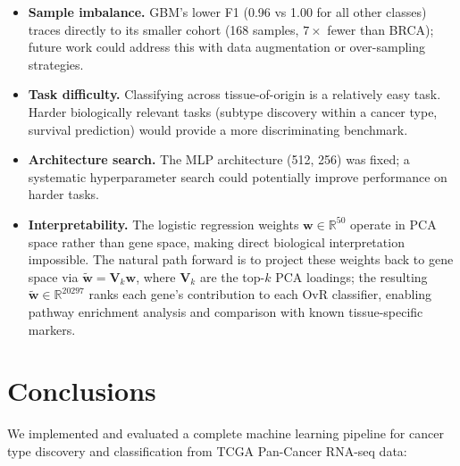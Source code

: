\documentclass[11pt,letterpaper]{article}
\begin{document}
\begin{itemize}[leftmargin=2em,itemsep=1pt]
  \item \textbf{Sample imbalance.}  GBM's lower F1 (0.96 vs 1.00 for all
        other classes) traces directly to its smaller cohort (168 samples,
        $7\times$ fewer than BRCA); future work could address this with
        data augmentation or over-sampling strategies.
  \item \textbf{Task difficulty.}  Classifying across tissue-of-origin is a
        relatively easy task.  Harder biologically relevant tasks (subtype
        discovery within a cancer type, survival prediction) would provide a
        more discriminating benchmark.
  \item \textbf{Architecture search.}  The MLP architecture (512, 256) was
        fixed; a systematic hyperparameter search could potentially improve
        performance on harder tasks.
  \item \textbf{Interpretability.}  The logistic regression weights
        $\mathbf{w} \in \mathbb{R}^{50}$ operate in PCA space rather than gene
        space, making direct biological interpretation impossible.  The natural
        path forward is to project these weights back to gene space via
        $\tilde{\mathbf{w}} = \mathbf{V}_k \mathbf{w}$, where $\mathbf{V}_k$
        are the top-$k$ PCA loadings; the resulting $\tilde{\mathbf{w}} \in
        \mathbb{R}^{20297}$ ranks each gene's contribution to each OvR
        classifier, enabling pathway enrichment analysis and comparison with
        known tissue-specific markers.
\end{itemize}

\section{Conclusions}
\label{sec:conclusions}

We implemented and evaluated a complete machine learning pipeline for cancer
type discovery and classification from TCGA Pan-Cancer RNA-seq data:
\end{document}
